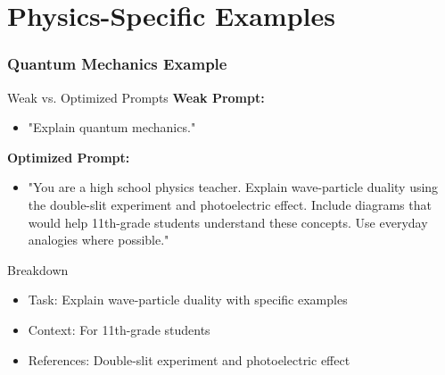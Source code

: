 \documentclass{beamer}
\begin{document}
\section{Physics-Specific Examples}
\frame{\sectionpage}
\begin{frame}
\frametitle{Quantum Mechanics Example}
\begin{block}{Weak vs. Optimized Prompts}
\textbf{Weak Prompt:} 
\begin{itemize}
\item "Explain quantum mechanics."
\end{itemize}

\textbf{Optimized Prompt:}
\begin{itemize}
\item "You are a high school physics teacher. Explain wave-particle duality using the double-slit experiment and photoelectric effect. Include diagrams that would help 11th-grade students understand these concepts. Use everyday analogies where possible."
\end{itemize}
\end{block}

\begin{alertblock}{Breakdown}
\begin{itemize}
\item Task: Explain wave-particle duality with specific examples
\item Context: For 11th-grade students
\item References: Double-slit experiment and photoelectric effect
\end{itemize}
\end{alertblock}
\end{frame}
\end{document}
